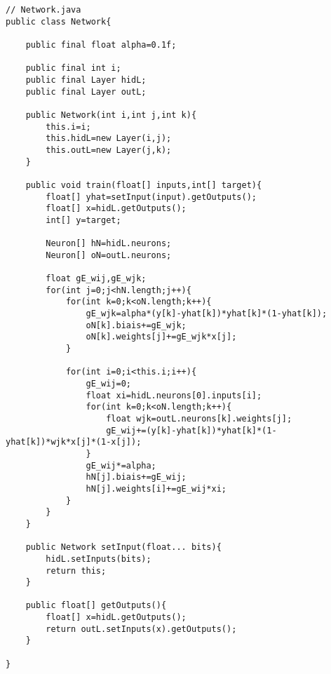 \documentclass{article}
\begin{document}
\newpage

\begin{lstlisting}
// Network.java
public class Network{
	
	public final float alpha=0.1f;
	
	public final int i;
	public final Layer hidL;
	public final Layer outL;
	
	public Network(int i,int j,int k){
		this.i=i;
		this.hidL=new Layer(i,j);
		this.outL=new Layer(j,k);
	}
	
	public void train(float[] inputs,int[] target){
		float[] yhat=setInput(input).getOutputs();
		float[] x=hidL.getOutputs();
		int[] y=target;
		
		Neuron[] hN=hidL.neurons;
		Neuron[] oN=outL.neurons;
		
		float gE_wij,gE_wjk;
		for(int j=0;j<hN.length;j++){
			for(int k=0;k<oN.length;k++){
				gE_wjk=alpha*(y[k]-yhat[k])*yhat[k]*(1-yhat[k]);
				oN[k].biais+=gE_wjk;
				oN[k].weights[j]+=gE_wjk*x[j];
			}
			
			for(int i=0;i<this.i;i++){
				gE_wij=0;
				float xi=hidL.neurons[0].inputs[i];
				for(int k=0;k<oN.length;k++){
					float wjk=outL.neurons[k].weights[j];
					gE_wij+=(y[k]-yhat[k])*yhat[k]*(1-yhat[k])*wjk*x[j]*(1-x[j]);
				}
				gE_wij*=alpha;
				hN[j].biais+=gE_wij;
				hN[j].weights[i]+=gE_wij*xi;
			}
		}
	}

	public Network setInput(float... bits){
		hidL.setInputs(bits);
		return this;
	}
	
	public float[] getOutputs(){
		float[] x=hidL.getOutputs();
		return outL.setInputs(x).getOutputs();
	}
	
}

\end{lstlisting}
\end{document}
